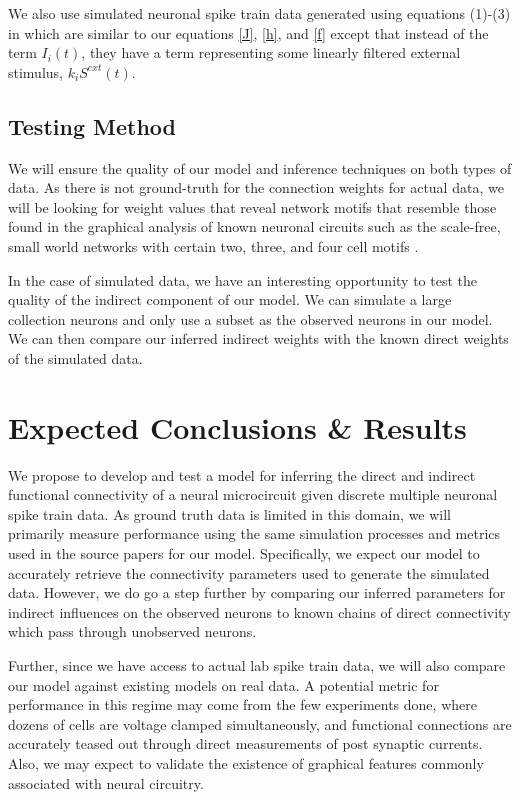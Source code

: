 \documentclass{article}
\begin{document}
We also use simulated neuronal spike train data generated using equations (1)-(3) in \citep{mishchencko2011} which are similar to our equations \eqref{J}, \eqref{h}, and \eqref{f} except that instead of the term $I_i(t)$, they have a term representing some linearly filtered external stimulus, $k_iS^{ext}(t)$.

\subsection{Testing Method}

We will ensure the quality of our model and inference techniques on both types of data. As there is not ground-truth for the connection weights for actual data, we will be looking for weight values that reveal network motifs that resemble those found in the graphical analysis of known neuronal circuits such as the scale-free, small world networks with certain two, three, and four cell motifs \citep{song2005,perin2011}.

In the case of simulated data, we have an interesting opportunity to test the quality of the indirect component of our model. We can simulate a large collection neurons and only use a subset as the observed neurons in our model. We can then compare our inferred indirect weights with the known direct weights of the simulated data.

\section{Expected Conclusions \& Results}
We propose to develop and test a model for inferring the direct and indirect functional connectivity of a neural microcircuit given discrete multiple neuronal spike train data. As ground truth data is limited in this domain, we will primarily measure performance using the same simulation processes and metrics used in the source papers for our model.  Specifically, we expect our model to accurately retrieve the connectivity parameters used to generate the simulated data. However, we do go a step further by comparing our inferred parameters for indirect influences on the observed neurons to known chains of direct connectivity which pass through unobserved neurons.

Further, since we have access to actual lab spike train data, we will also compare our model against existing models on real data.  A potential metric for performance in this regime may come from the few experiments done, where dozens of cells are voltage clamped simultaneously, and functional connections are accurately teased out through direct measurements of post synaptic currents.  Also, we may expect to validate the existence of graphical features commonly associated with neural circuitry.

\begin{small}

 
\end{small}
\end{document}
